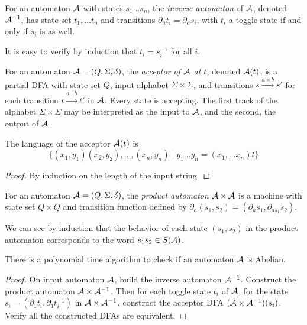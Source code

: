 \documentclass[11pt, titlepage]{article}
\begin{document}
\begin{definition}
  For an automaton $\mathcal{A}$ with states $s_1 \ldots s_n$, the
  \emph{inverse automaton} of $\mathcal{A}$, denoted $\mathcal{A}^{-1}$, has state set
  $t_1, \ldots t_n$ and transitions
  $\partial_a t_i = \partial_{\overline{a}} s_i$, with $t_i$ a toggle state
  if and only if $s_i$ is as well.
\end{definition}

It is easy to verify by induction that $t_i = s_i^{-1}$ for all $i$.

\begin{definition}
  For an automaton $\mathcal{A} = (Q,\Sigma, \delta)$, the \emph{acceptor of
    $\mathcal{A}$ at $t$}, denoted $\mathcal{A}(t)$, is a partial DFA with state set
  $Q$, input alphabet $\Sigma \times \Sigma$, and transitions
  $s \stackrel{a \times b}{\longrightarrow} s'$ for each transition
  $t \stackrel{a \mid b}{\longrightarrow} t'$ in $\mathcal{A}$. Every state is
  accepting. The first track of the alphabet $\Sigma\times\Sigma$ may
  be interpreted as the input to $\mathcal{A}$, and the second, the output of
  $\mathcal{A}$.
\end{definition}

\begin{lemma}
  The language of the acceptor $\mathcal{A}(t)$ is
  \[
    \{(x_1, y_1)(x_2, y_2),\ldots,(x_n, y_n) \mid y_1\ldots y_n =
    (x_1,\ldots x_n)t \}
  \]
\end{lemma}
\begin{proof}
  By induction on the length of the input string.
\end{proof}

\begin{definition}
  For an automaton $\mathcal{A} = (Q, \Sigma, \delta)$, the \emph{product
    automaton} $\mathcal{A} \times \mathcal{A}$ is a machine with state set $Q\times Q$
  and transition function defined by
  $\partial_a (s_1, s_2) = (\partial_a s_1, \partial_{a s_1} s_2)$.
\end{definition}

We can see by induction that the behavior of each state $(s_1, s_2)$
in the product automaton corresponds to the word $s_1 s_2 \in S(\mathcal{A})$.

\begin{theorem}
  There is a polynomial time algorithm to check if an automaton $\mathcal{A}$
  is Abelian.
\end{theorem}

\begin{proof}
  On input automaton $\mathcal{A}$, build the inverse automaton
  $\mathcal{A}^{-1}$. Construct the product automaton $\mathcal{A}\times \mathcal{A}^{-1}$. Then
  for each toggle state $t_i$ of $\mathcal{A}$, for the state
  $s_i = (\partial_1 t_i, \partial_1 t_i^{-1})$ in $\mathcal{A}\times \mathcal{A}^{-1}$,
  construct the acceptor DFA $(\mathcal{A}\times \mathcal{A}^{-1})(s_i)$. Verify all the
  constructed DFAs are equivalent.
\end{proof}
\end{document}
